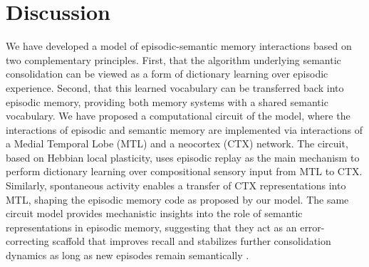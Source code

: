\documentclass{article}
\providecommand{\DIFaddtex}[1]{{\protect\color{blue}\uwave{#1}}} %
\providecommand{\DIFaddbegin}{} %
\providecommand{\DIFaddend}{} %
\providecommand{\DIFadd}[1]{\texorpdfstring{\DIFaddtex{#1}}{#1}} %
\begin{document}
\section*{Discussion}
We have developed a model of episodic-semantic memory interactions based on two complementary principles. First, that the algorithm underlying semantic consolidation can be viewed as a form of dictionary learning over episodic experience. Second, that this learned vocabulary can be transferred back into episodic memory, providing both memory systems with a shared semantic vocabulary. We have proposed a computational circuit of the model, where the interactions of episodic and semantic memory are implemented via interactions of a Medial Temporal Lobe (MTL) and a neocortex (CTX) network. The circuit, based on Hebbian local plasticity, uses episodic replay as the main mechanism to perform dictionary learning over compositional sensory input from MTL to CTX. Similarly, spontaneous  \DIFaddbegin \DIFadd{cortical }\DIFaddend activity enables a transfer of CTX representations into MTL, shaping the episodic memory code as proposed by our model. The same circuit model provides mechanistic insights into the role of semantic representations in episodic memory, suggesting that they act as an error-correcting scaffold that improves recall and stabilizes further consolidation dynamics as long as new episodes remain semantically  \DIFaddbegin \DIFadd{in-distribution}\DIFaddend .
\newline\newline
\end{document}

